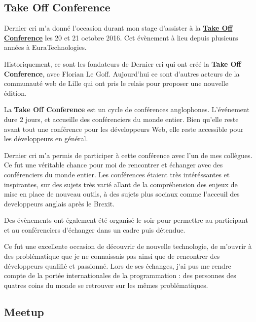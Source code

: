 \bigskip

\subsection{Take Off Conference}\label{take-off-conference}

\bigskip

Dernier cri m'a donné l'occasion durant mon stage d'assister à la
\href{http://takeoffconf.com/2016}{\textbf{Take Off Conference}} les 20
et 21 octobre 2016. Cet évènement à lieu depuis plusieurs années à
EuraTechnologies.

\bigskip

Historiquement, ce sont les fondateurs de Dernier cri qui ont créé la
\textbf{Take Off Conference}, avec Florian Le Goff. Aujourd'hui ce sont
d'autres acteurs de la communauté web de Lille qui ont pris le relais
pour proposer une nouvelle édition.

\bigskip

La \textbf{Take Off Conference} est un cycle de conférences anglophones.
L'événement dure 2 jours, et accueille des conférenciers du monde
entier. Bien qu'elle reste avant tout une conférence pour les
développeurs Web, elle reste accessible pour les développeurs en
général.

\bigskip

Dernier cri m'a permis de participer à cette conférence avec l'un de mes
collègues. Ce fut une véritable chance pour moi de rencontrer et
échanger avec des conférenciers du monde entier. Les conférences étaient
très intéréssantes et inspirantes, sur des sujets très varié allant de
la compréhension des enjeux de mise en place de nouveau outils, à des
sujets plus sociaux comme l'acceuil des developpeurs anglais après le
Brexit.

\bigskip

Des évènements ont également été organisé le soir pour permettre au
participant et au conférenciers d'échanger dans un cadre puis détendue.

\bigskip

Ce fut une excellente occasion de découvrir de nouvelle technologie, de
m'ouvrir à des problématique que je ne connaissais pas ainsi que de
rencontrer des développeurs qualifié et passionné. Lors de ses échanges,
j'ai pus me rendre compte de la portée internationales de la
programmation : des personnes des quatres coins du monde se retrouver
sur les mêmes problématiques.

\bigskip

\subsection{Meetup}\label{meetup}

